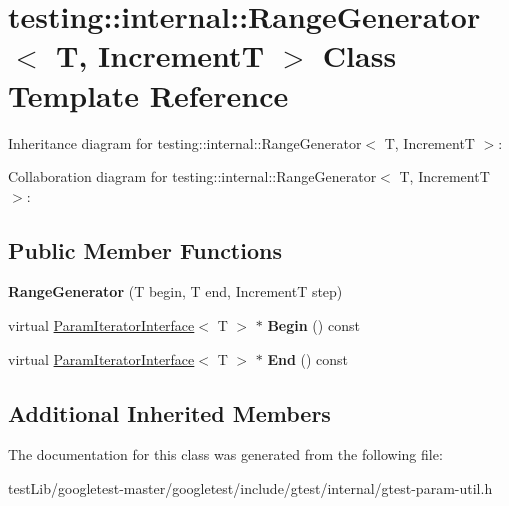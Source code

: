 \hypertarget{classtesting_1_1internal_1_1RangeGenerator}{}\section{testing\+:\+:internal\+:\+:Range\+Generator$<$ T, IncrementT $>$ Class Template Reference}
\label{classtesting_1_1internal_1_1RangeGenerator}


Inheritance diagram for testing\+:\+:internal\+:\+:Range\+Generator$<$ T, IncrementT $>$\+:


Collaboration diagram for testing\+:\+:internal\+:\+:Range\+Generator$<$ T, IncrementT $>$\+:
\subsection*{Public Member Functions}
\begin{DoxyCompactItemize}
\item 
\mbox{\label{classtesting_1_1internal_1_1RangeGenerator_a5b3b83223b9cada3569bcee729e0fdf3}} 
{\bfseries Range\+Generator} (T begin, T end, IncrementT step)
\item 
\mbox{\label{classtesting_1_1internal_1_1RangeGenerator_ae68b59f9348ecf93e0947545a2424765}} 
virtual \hyperlink{classtesting_1_1internal_1_1ParamIteratorInterface}{Param\+Iterator\+Interface}$<$ T $>$ $\ast$ {\bfseries Begin} () const
\item 
\mbox{\label{classtesting_1_1internal_1_1RangeGenerator_a8d2acbb733791a14df6e7bd3754e9003}} 
virtual \hyperlink{classtesting_1_1internal_1_1ParamIteratorInterface}{Param\+Iterator\+Interface}$<$ T $>$ $\ast$ {\bfseries End} () const
\end{DoxyCompactItemize}
\subsection*{Additional Inherited Members}


The documentation for this class was generated from the following file\+:\begin{DoxyCompactItemize}
\item 
test\+Lib/googletest-\/master/googletest/include/gtest/internal/gtest-\/param-\/util.\+h\end{DoxyCompactItemize}
